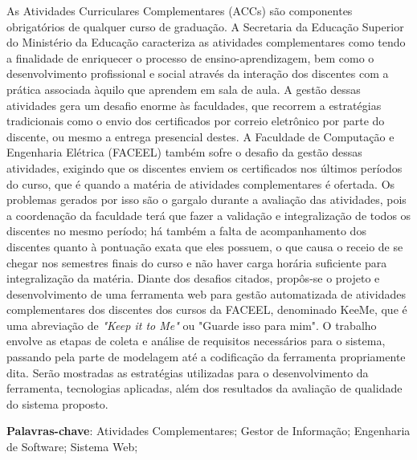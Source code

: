 
\begin{resumo}[RESUMO]
\begin{SingleSpacing}

As Atividades Curriculares Complementares (ACCs) são componentes obrigatórios de qualquer curso de graduação. A Secretaria da Educação Superior do Ministério da Educação caracteriza as atividades complementares como tendo a finalidade de enriquecer o processo de ensino-aprendizagem, bem como o desenvolvimento profissional e social através da interação dos discentes com a prática associada àquilo que aprendem em sala de aula. A gestão dessas atividades gera um desafio enorme às faculdades, que recorrem a estratégias tradicionais como o envio dos certificados por correio eletrônico por parte do discente, ou mesmo a entrega presencial destes. A Faculdade de Computação e Engenharia Elétrica (FACEEL) também sofre o desafio da gestão dessas atividades, exigindo que os discentes enviem os certificados nos últimos períodos do curso, que é quando a matéria de atividades complementares é ofertada. Os problemas gerados por isso são o gargalo durante a avaliação das atividades, pois a coordenação da faculdade terá que fazer a validação e integralização de todos os discentes no mesmo período; há também a falta de acompanhamento dos discentes quanto à pontuação exata que eles possuem, o que causa o receio de se chegar nos semestres finais do curso e não haver carga horária suficiente para integralização da matéria. Diante dos desafios citados, propôs-se o projeto e desenvolvimento de uma ferramenta web para gestão automatizada de atividades complementares dos discentes dos cursos da FACEEL, denominado KeeMe, que é uma abreviação de \textit{"Keep it to Me"} ou "Guarde isso para mim". O trabalho envolve as etapas de coleta e análise de requisitos necessários para o sistema, passando pela parte de modelagem até a codificação da ferramenta propriamente dita. Serão mostradas as estratégias utilizadas para o desenvolvimento da ferramenta, tecnologias aplicadas, além dos resultados da avaliação de qualidade do sistema proposto.

\end{SingleSpacing}

\textbf{Palavras-chave}: Atividades Complementares; Gestor de Informação; Engenharia de Software; Sistema Web;

\end{resumo}


